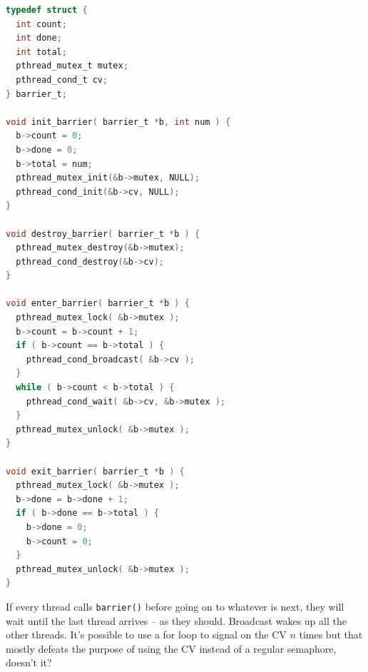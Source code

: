 \begin{lstlisting}[language=C]
typedef struct {
  int count;
  int done;
  int total;
  pthread_mutex_t mutex;
  pthread_cond_t cv;
} barrier_t;

void init_barrier( barrier_t *b, int num ) {
  b->count = 0;
  b->done = 0;
  b->total = num;
  pthread_mutex_init(&b->mutex, NULL);
  pthread_cond_init(&b->cv, NULL);
}

void destroy_barrier( barrier_t *b ) {
  pthread_mutex_destroy(&b->mutex);
  pthread_cond_destroy(&b->cv);
}

void enter_barrier( barrier_t *b ) {
  pthread_mutex_lock( &b->mutex );
  b->count = b->count + 1;
  if ( b->count == b->total ) {
    pthread_cond_broadcast( &b->cv );
  }
  while ( b->count < b->total ) {
    pthread_cond_wait( &b->cv, &b->mutex );
  }
  pthread_mutex_unlock( &b->mutex );
}

void exit_barrier( barrier_t *b ) {
  pthread_mutex_lock( &b->mutex );
  b->done = b->done + 1;
  if ( b->done == b->total ) {
    b->done = 0;
    b->count = 0;
  }
  pthread_mutex_unlock( &b->mutex );
}
\end{lstlisting}

If every thread calls \texttt{barrier()} before going on to whatever is next, they will wait until the last thread arrives -- as they should. Broadcast wakes up all the other threads. It's possible to use a for loop to signal on the CV $n$ times but that mostly defeats the purpose of using the CV instead of a regular semaphore, doesn't it?



